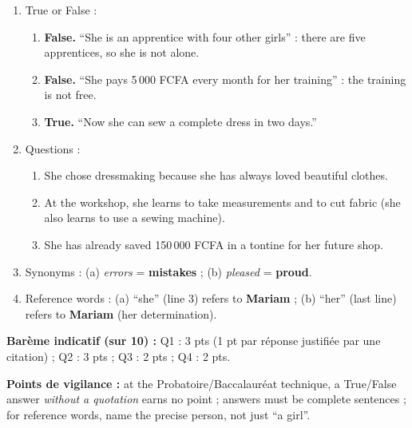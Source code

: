 \documentclass[11pt]{article}
\begin{document}
\begin{corrige}
\begin{enumerate}
\item True or False :
\begin{enumerate}
\item[a.] \textbf{False.} ``She is an apprentice with four other girls'' : there are five apprentices, so she is not alone.
\item[b.] \textbf{False.} ``She pays 5\,000 FCFA every month for her training'' : the training is not free.
\item[c.] \textbf{True.} ``Now she can sew a complete dress in two days.''
\end{enumerate}
\item Questions :
\begin{enumerate}
\item[a.] She chose dressmaking because she has always loved beautiful clothes.
\item[b.] At the workshop, she learns to take measurements and to cut fabric (she also learns to use a sewing machine).
\item[c.] She has already saved 150\,000 FCFA in a tontine for her future shop.
\end{enumerate}
\item Synonyms : (a) \emph{errors} = \textbf{mistakes} ; (b) \emph{pleased} = \textbf{proud}.
\item Reference words : (a) ``she'' (line 3) refers to \textbf{Mariam} ; (b) ``her'' (last line) refers to \textbf{Mariam} (her determination).
\end{enumerate}
\textbf{Barème indicatif (sur 10) :} Q1 : 3 pts (1 pt par réponse justifiée par une citation) ; Q2 : 3 pts ; Q3 : 2 pts ; Q4 : 2 pts.

\textbf{Points de vigilance :} at the Probatoire/Baccalauréat technique, a True/False answer \emph{without a quotation} earns no point ; answers must be complete sentences ; for reference words, name the precise person, not just ``a girl''.
\end{corrige}
\end{document}
